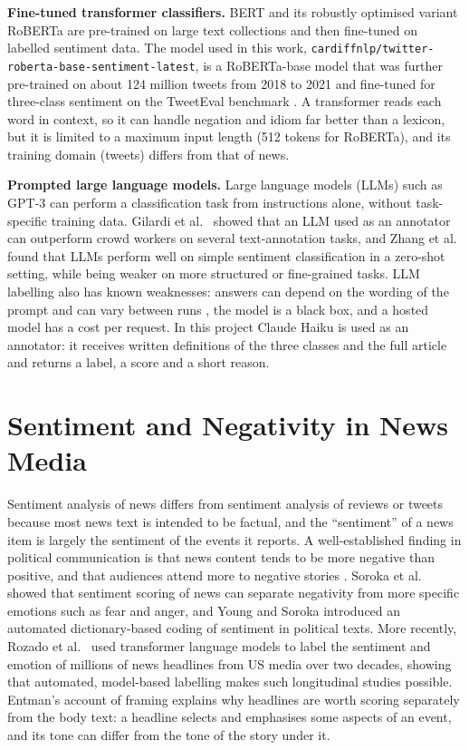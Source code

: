 \noindent\textbf{Fine-tuned transformer classifiers.} BERT \cite{devlin2019} and its robustly optimised variant RoBERTa \cite{liu2019} are pre-trained on large text collections and then fine-tuned on labelled sentiment data. The model used in this work, \texttt{cardiffnlp/twitter-roberta-base-sentiment-latest}, is a RoBERTa-base model that was further pre-trained on about 124 million tweets from 2018 to 2021 \cite{loureiro2022} and fine-tuned for three-class sentiment on the TweetEval benchmark \cite{barbieri2020}. A transformer reads each word in context, so it can handle negation and idiom far better than a lexicon, but it is limited to a maximum input length (512 tokens for RoBERTa), and its training domain (tweets) differs from that of news.

\noindent\textbf{Prompted large language models.} Large language models (LLMs) such as GPT-3 \cite{brown2020} can perform a classification task from instructions alone, without task-specific training data. Gilardi et al.\ \cite{gilardi2023} showed that an LLM used as an annotator can outperform crowd workers on several text-annotation tasks, and Zhang et al.\ \cite{zhang2023} found that LLMs perform well on simple sentiment classification in a zero-shot setting, while being weaker on more structured or fine-grained tasks. LLM labelling also has known weaknesses: answers can depend on the wording of the prompt and can vary between runs \cite{reiss2023}, the model is a black box, and a hosted model has a cost per request. In this project Claude Haiku \cite{anthropic2026} is used as an annotator: it receives written definitions of the three classes and the full article and returns a label, a score and a short reason.

\section{Sentiment and Negativity in News Media}

Sentiment analysis of news differs from sentiment analysis of reviews or tweets because most news text is intended to be factual, and the ``sentiment'' of a news item is largely the sentiment of the events it reports. A well-established finding in political communication is that news content tends to be more negative than positive, and that audiences attend more to negative stories \cite{soroka2015news}. Soroka et al.\ \cite{soroka2015bad} showed that sentiment scoring of news can separate negativity from more specific emotions such as fear and anger, and Young and Soroka \cite{young2012} introduced an automated dictionary-based coding of sentiment in political texts. More recently, Rozado et al.\ \cite{rozado2022} used transformer language models to label the sentiment and emotion of millions of news headlines from US media over two decades, showing that automated, model-based labelling makes such longitudinal studies possible. Entman's account of framing \cite{entman1993} explains why headlines are worth scoring separately from the body text: a headline selects and emphasises some aspects of an event, and its tone can differ from the tone of the story under it.


